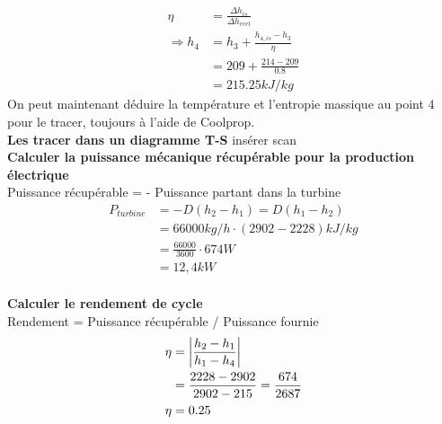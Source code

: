 \documentclass[12pt]{article}
\begin{document}
\begin{align*}
\eta &= \frac{\Delta h_{is}}{\Delta h_{reel}} \\
\Rightarrow h_4 &= h_3 + \frac{h_{4,is}-h_3}{\eta} \\
&= 209 + \frac{214-209}{0.8} \\
&= 215.25 kJ/kg
\end{align*}
On peut maintenant déduire la température et l'entropie massique au point 4 pour le tracer, toujours à l'aide de Coolprop.
\\

\textbf{Les tracer dans un diagramme T-S}
insérer scan
\\

\textbf{Calculer la puissance mécanique récupérable pour la production électrique}
\\
Puissance récupérable = - Puissance partant dans la turbine
\begin{align*}
P_{turbine} &= - D(h_2-h_1) = D(h_1-h_2)\\
&= 66000kg/h\cdot(2902-2228)kJ/kg \\
&= \frac{66000}{3600} \cdot 674 W \\
&= 12,4 kW
\end{align*}
\\

\textbf{Calculer le rendement de cycle}
\\
Rendement = Puissance récupérable / Puissance fournie
\begin{align*}
\eta &= \displaystyle\left\lvert\frac{h_2-h_1}{h_1-h_4}\displaystyle\right\rvert\\
&= \frac{2228-2902}{2902-215} = \frac{674}{2687} \\
\eta &= 0.25
\end{align*}
\end{document}
